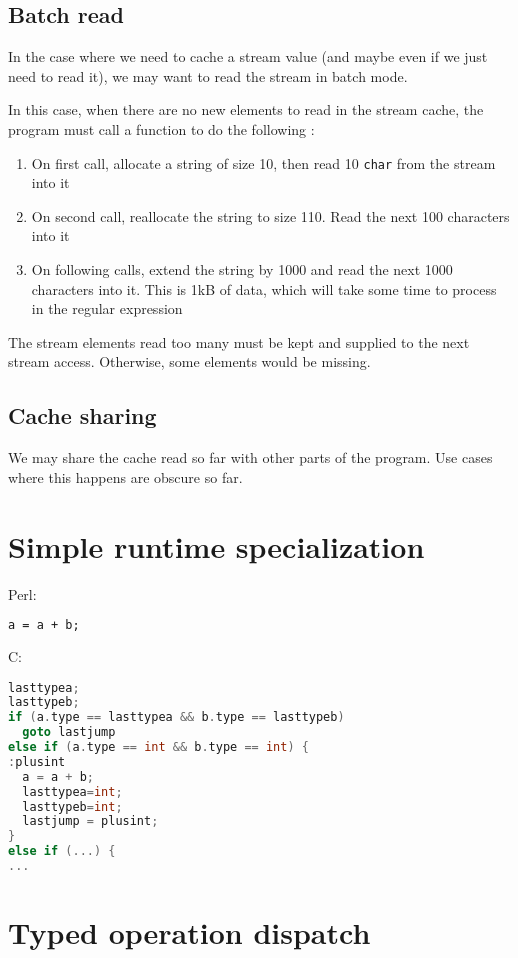 \documentclass[11pt,a4paper]{report}
\newcommand{\ccode}[1]{\texttt{#1}}
\begin{document}
\subsection{Batch read}

In the case where we need to cache a stream value (and maybe even if we just need to read it), we may want to read the stream in batch mode.

In this case, when there are no new elements to read in the stream cache, the program must call a function to do the following :
\begin{enumerate}
\item On first call, allocate a string of size 10, then read 10 \ccode{char} from the stream into it
\item On second call, reallocate the string to size 110. Read the next 100 characters into it
\item On following calls, extend the string by 1000 and read the next 1000 characters into it. This is 1kB of data, which will take some time to process in the regular expression
\end{enumerate}

The stream elements read too many must be kept and supplied to the next stream access. Otherwise, some elements would be missing.

\subsection{Cache sharing}

We may share the cache read so far with other parts of the program. Use cases where this happens are obscure so far.

\section{Simple runtime specialization}


Perl:
\begin{lstlisting}[language=perl]
a = a + b;
\end{lstlisting}

C:
\begin{lstlisting}[language=C]
lasttypea;
lasttypeb;
if (a.type == lasttypea && b.type == lasttypeb)
  goto lastjump
else if (a.type == int && b.type == int) {
:plusint
  a = a + b;
  lasttypea=int;
  lasttypeb=int;
  lastjump = plusint;
}
else if (...) {	
...
\end{lstlisting}

\section{Typed operation dispatch}
\end{document}
